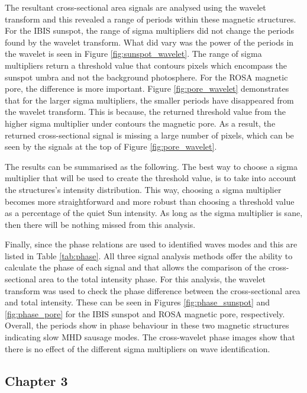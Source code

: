     The resultant cross-sectional area signals are analysed using the wavelet transform and this revealed a range of periods within these magnetic structures.
    For the IBIS sunspot, the range of sigma multipliers did not change the periods found by the wavelet transform.
    What did vary was the power of the periods in the wavelet is seen in Figure \ref{fig:sunspot_wavelet}. 
    The range of sigma multipliers return a threshold value that contours pixels which encompass the sunspot umbra and not the background photosphere.
    For the ROSA magnetic pore, the difference is more important.
    Figure \ref{fig:pore_wavelet} demonstrates that for the larger sigma multipliers, the smaller periods have disappeared from the wavelet transform. 
    This is because, the returned threshold value from the higher sigma multiplier under contours the magnetic pore.
    As a result, the returned cross-sectional signal is missing a large number of pixels, which can be seen by the signals at the top of Figure \ref{fig:pore_wavelet}.
        
    The results can be summarised as the following.
    The best way to choose a sigma multiplier that will be used to create the threshold value, is to take into account the structures's intensity distribution.
    This way, choosing a sigma multiplier becomes more straightforward and more robust than choosing a threshold value as a percentage of the quiet Sun intensity.
    As long as the sigma multiplier is sane, then there will be nothing missed from this analysis.
    
    Finally, since the phase relations are used to identified waves modes and this are listed in Table \ref{tab:phase}.
    All three signal analysis methods offer the ability to calculate the phase of each signal and that allows the comparison of the cross-sectional area to the total intensity phase.
    For this analysis, the wavelet transform was used to check the phase difference between the cross-sectional area and total intensity.
    These can be seen in Figures \ref{fig:phase_sunspot} and \ref{fig:phase_pore} for the IBIS sunspot and ROSA magnetic pore, respectively.
    Overall, the periods show in phase behaviour in these two magnetic structures indicating slow MHD sausage modes. 
    The cross-wavelet phase images show that there is no effect of the different sigma multipliers on wave identification. 
    
   	\subsection{Chapter 3}
    	
